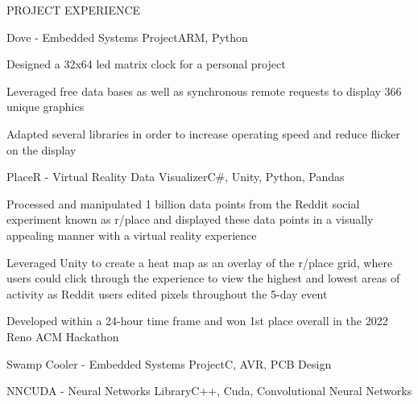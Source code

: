 \documentclass{resume} %
\begin{document}

\begin{rSection}{PROJECT EXPERIENCE}

	\begin{rSubsection}{Dove - Embedded Systems Project}{ARM, Python}{}{}
		\item Designed a 32x64 led matrix clock for a personal project
		\item Leveraged free data bases as well as synchronous remote requests to display 366 unique graphics
		\item Adapted several libraries in order to increase operating speed and reduce flicker on the display
	\end{rSubsection}

	\begin{rSubsection}{PlaceR - Virtual Reality Data Visualizer}{C\#, Unity, Python, Pandas}{}{}
		\item Processed and manipulated 1 billion data points from the Reddit social experiment known as r/place and displayed
		these data points in a visually appealing manner with a virtual reality experience
		\item Leveraged Unity to create a heat map as an overlay of the r/place grid, where users could click through the 
		experience to view the highest and lowest areas of activity as Reddit users edited pixels throughout the 5-day event
		\item Developed within a 24-hour time frame and won 1st place overall in the 2022 Reno ACM Hackathon
	\end{rSubsection}

	\begin{rSubsection}{Swamp Cooler - Embedded Systems Project}{C, AVR, PCB Design}{}{}

	\end{rSubsection}

	\begin{rSubsection}{NNCUDA - Neural Networks Library}{C++, Cuda, Convolutional Neural Networks}{}{}
	\end{rSubsection}

\end{rSection}

\end{document}
